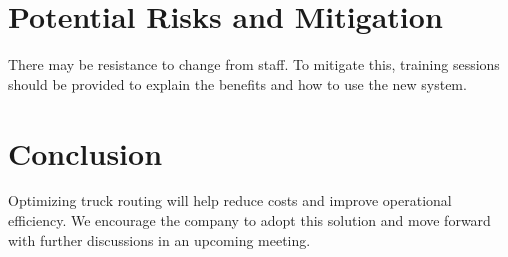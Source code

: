 \documentclass[a4paper,12pt, final]{article}
\begin{document}
\section{Potential Risks and Mitigation}
There may be resistance to change from staff. To mitigate this, training sessions should be provided
to explain the benefits and how to use the new system.


\section{Conclusion}
Optimizing truck routing will help reduce costs and improve operational efficiency. We encourage
the company to adopt this solution and move forward with further discussions in an upcoming
meeting.





\end{document}
